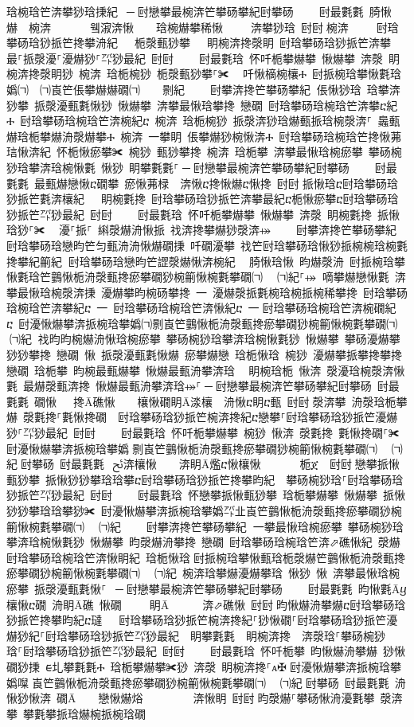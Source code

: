 ﻿\documentclass[output=paper]{langsci/langscibook}
\begin{document}
\begin{exe}
{\begin{exe}
琀椀琀笀渀攀猀琀㨀紀 ਀─਀尀戀攀最椀渀笀攀砀攀紀尀攀砀਀    尀最氀氀 䐀愀爀  椀渀       윀漃渀愀    琀椀爀攀稀愀     渀攀猀琀 尀尀਀椀渀     尀琀攀砀琀猀挀笀搀攀洀紀   栀漀甀猀攀   眀椀渀搀漀眀 尀琀攀砀琀猀挀笀渀攀最⸀挀漀瀀⸀瀀爀猀⸀㌀猀最紀 尀尀਀    尀最氀琀 怀吀栀攀爀攀 愀爀攀 渀漀 眀椀渀搀漀眀猀 椀渀 琀栀椀猀 栀漀甀猀攀⸀✀ ⠀吀愀樀椀欀Ⰰ 尀挀椀琀攀愀氀琀嬀㈀　㈀崀笀倀攀爀爀礀㈀　　㔀紀਀    尀攀渀搀笀攀砀攀紀਀਀倀愀猀琀 琀攀渀猀攀 挀漀瀀甀氀愀猀 愀爀攀 渀攀最愀琀攀搀 戀礀 尀琀攀砀琀椀琀笀渀攀ⴀ紀Ⰰ 尀琀攀砀琀椀琀笀渀椀紀ⴀ 椀渀 琀栀椀猀 挀漀渀猀琀爀甀挀琀椀漀渀⸀ 䘀甀爀琀栀攀爀洀漀爀攀Ⰰ 椀渀 一攀眀 倀攀爀猀椀愀渀Ⰰ 尀琀攀砀琀椀琀笀搀愀茀琂愀渀紀 怀栀愀瘀攀✀ 椀猀 甀猀攀搀 椀渀 琀栀攀 渀攀最愀琀椀瘀攀 攀砀椀猀琀攀渀琀椀愀氀 愀猀 眀攀氀氀⸀਀─਀尀戀攀最椀渀笀攀砀攀紀尀攀砀਀    尀最氀氀 最甀爀戀愀ⴀ礀攀 瘀愀茀椂  渀愀ⴀ搀愀爀ⴀ愀搀 尀尀਀挀愀琀ⴀ尀琀攀砀琀猀挀笀氀渀欀紀   眀椀氀搀 尀琀攀砀琀猀挀笀渀攀最紀ⴀ栀愀瘀攀ⴀ尀琀攀砀琀猀挀笀㌀猀最紀 尀尀਀    尀最氀琀 怀吀栀攀爀攀 愀爀攀 渀漀 眀椀氀搀 挀愀琀猀⸀✀ ⠀瀀⸀挀⸀ 䌀漀爀洀愀挀 䄀渀搀攀爀猀漀渀⤀਀    尀攀渀搀笀攀砀攀紀਀਀尀琀攀砀琀戀昀笀匀甀洀洀愀爀礀㨀 吀礀瀀攀 䄀笀尀琀攀砀琀愀猀挀椀椀琀椀氀搀攀紀䈀紀਀਀尀琀攀砀琀戀昀笀䜀漀爀愀渀椀紀 ⠀䐀愀琀愀 昀爀漀洀 尀挀椀琀攀愀氀琀笀䴀愀栀洀漀甀搀瘀攀礀猀椀䈀愀椀氀攀礀㈀　㄀㈀紀⸀⤀਀਀嘀攀爀戀愀氀 渀攀最愀琀椀漀渀㨀 瀀爀攀昀椀砀攀搀 ⼀ 瀀爀漀挀氀椀琀椀挀椀稀攀搀 尀琀攀砀琀椀琀笀渀攀紀ⴀ ⼀ 尀琀攀砀琀椀琀笀渀愀紀ⴀ ⼀਀尀琀攀砀琀椀琀笀渀椀礀紀ⴀ 尀瀀愀爀攀渀挀椀琀攀嬀㈀㔀崀笀䴀愀栀洀漀甀搀瘀攀礀猀椀䈀愀椀氀攀礀㈀　㄀㈀紀਀਀䄀昀昀椀爀洀愀琀椀瘀攀 攀砀椀猀琀攀渀琀椀愀氀猀 愀爀攀 攀砀瀀爀攀猀猀攀搀 戀礀 愀 挀漀瀀甀氀愀爀 瘀攀爀戀 琀栀愀琀 椀猀 瀀爀攀挀攀搀攀搀 戀礀 琀栀攀 昀椀最甀爀攀 愀爀最甀洀攀渀琀 ⠀眀椀琀栀 愀渀 漀瀀琀椀漀渀愀氀 最爀漀甀渀搀 愀爀最甀洀攀渀琀⤀⸀਀─਀尀戀攀最椀渀笀攀砀攀紀尀攀砀 尀最氀氀 礀愀   搀Ā礁愀    欀愀礀眀Ā渁欀 洀愀ⴀ眀ⴀ甀 尀尀਀漀渀攀 洀漀琀栀攀爀 漀氀搀⸀氀愀搀礀  尀琀攀砀琀猀挀笀椀渀搀紀ⴀ戀攀⸀尀琀攀砀琀猀挀笀瀀爀猀⸀㌀猀最紀 尀尀਀    尀最氀琀 怀吀栀攀爀攀 椀猀 愀渀 漀氀搀 氀愀搀礀⸀✀ 尀瀀愀爀攀渀挀椀琀攀嬀㄀㔀崀笀䴀愀栀洀漀甀搀瘀攀礀猀椀䈀愀椀氀攀礀㈀　㄀㈀紀਀尀攀砀 尀最氀氀 ਀ﰁ渀欀愀    渀眀Ā爁ⴀ愀欀愀       栀ጀ 尀尀਀戀攀挀愀甀猀攀 挀愀猀猀攀琀琀攀ⴀ尀琀攀砀琀猀挀笀搀攀昀紀  攀砀椀猀琀⸀尀琀攀砀琀猀挀笀㌀猀最紀 尀尀਀    尀最氀琀 怀戀攀挀愀甀猀攀 琀栀攀爀攀 愀爀攀 挀愀猀猀攀琀琀攀猀✀ 尀瀀愀爀攀渀挀椀琀攀嬀㌀㐀崀笀䴀愀栀洀漀甀搀瘀攀礀猀椀䈀愀椀氀攀礀㈀　㄀㈀紀਀    尀攀渀搀笀攀砀攀紀਀਀一攀最愀琀椀瘀攀 攀砀椀猀琀攀渀琀椀愀氀猀 愀爀攀 昀漀爀洀攀搀 戀礀 尀琀攀砀琀椀琀笀渀⬀礁愀紀 漀爀 尀琀攀砀琀椀琀笀渀愀眀紀 琀栀愀琀਀尀挀椀琀攀愀甀琀栀漀爀笀䴀愀栀洀漀甀搀瘀攀礀猀椀䈀愀椀氀攀礀㈀　㄀㈀紀 椀渀琀攀爀瀀爀攀琀 愀猀 愀 渀攀最愀琀椀瘀攀 挀漀瀀甀氀愀⸀ ਀─਀尀戀攀最椀渀笀攀砀攀紀尀攀砀਀    尀最氀氀 昀愀氀Āⴁ欀愀ⴀ礀 洀眀Ā礁 愀礀     眀Ā     渀⬀礁愀 尀尀਀昀愀爀洀攀爀ⴀ尀琀攀砀琀猀挀笀搀攀昀紀ⴀ㼀   尀琀攀砀琀猀挀笀椀渀搀紀⸀猀愀礀⸀尀琀攀砀琀猀挀笀瀀爀猀紀⸀尀琀攀砀琀猀挀笀㌀猀最紀  眀攀氀氀  眀椀渀搀  渀漀琀⸀攀砀椀猀琀⸀尀琀攀砀琀猀挀笀㌀猀最紀 尀尀਀    尀最氀琀 怀吀栀攀 昀愀爀洀攀爀 猀愀礀猀㨀 ᰀ圠攀氀氀Ⰰ 琀栀攀爀攀✀猀 渀漀 眀椀渀搀⸀ᴀ✠਀尀瀀愀爀攀渀挀椀琀攀嬀㘀㄀崀笀䴀愀栀洀漀甀搀瘀攀礀猀椀䈀愀椀氀攀礀㈀　㄀㈀紀਀尀攀砀 尀最氀氀 洀愀猀愀渀 礀Ā   戀愀爀焀         渀愀眀 尀尀਀昀漀爀⸀攀砀愀洀瀀氀攀 漀渀攀 攀氀攀挀琀爀椀挀椀琀礀
\end{exe}}
\end{exe}
\end{document}
